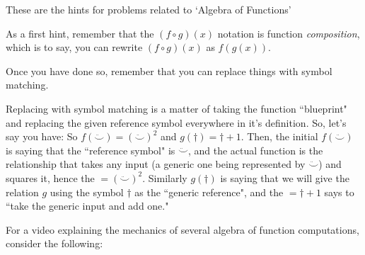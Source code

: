 \begin{hint}
    These are the hints for problems related to `Algebra of Functions'
    
    As a first hint, remember that the $(f\circ g)(x)$ notation is function \textit{composition}, which is to say, you can rewrite $(f \circ g)(x)$ as $f(g(x))$.
    
    Once you have done so, remember that you can replace things with symbol matching.
    
    \begin{hint}
        Replacing with symbol matching is a matter of taking the function ``blueprint" and replacing the given reference symbol everywhere in it's definition. So, let's say you have:  So $f(\ddot\smile) = (\ddot\smile)^2$ and $g(\dagger) = \dagger + 1$. Then, the initial $f(\ddot\smile)$ is saying that the ``reference symbol" is $\ddot\smile$, and the actual function is the relationship that takes any input (a generic one being represented by $\ddot\smile$) and squares it, hence the $ = (\ddot\smile)^2$. Similarly $g(\dagger)$ is saying that we will give the relation $g$ using the symbol $\dagger$ as the ``generic reference", and the $ = \dagger + 1$ says to ``take the generic input and add one."
        
        \begin{hint}
            For a video explaining the mechanics of several algebra of function computations, consider the following:
        \end{hint}
    \end{hint}
\end{hint}